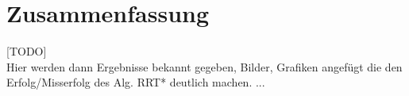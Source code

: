 \section{Zusammenfassung}
\label{Zusammenfassung}
[TODO] \\
Hier werden dann Ergebnisse bekannt gegeben, Bilder, Grafiken angefügt die den Erfolg/Misserfolg des Alg. RRT* deutlich machen.
...
